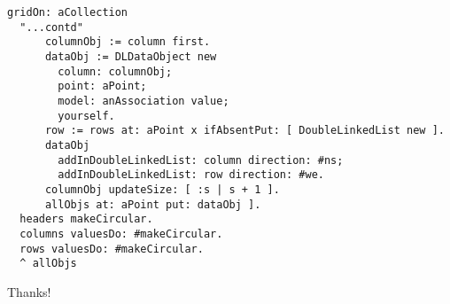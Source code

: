 \documentclass{beamer}
\begin{document}
\begin{frame}[fragile]
\begin{verbatim}
gridOn: aCollection
  "...contd"
      columnObj := column first.
      dataObj := DLDataObject new
        column: columnObj;
        point: aPoint;
        model: anAssociation value;
        yourself.
      row := rows at: aPoint x ifAbsentPut: [ DoubleLinkedList new ].
      dataObj
        addInDoubleLinkedList: column direction: #ns;
        addInDoubleLinkedList: row direction: #we.
      columnObj updateSize: [ :s | s + 1 ].
      allObjs at: aPoint put: dataObj ].
  headers makeCircular.
  columns valuesDo: #makeCircular.
  rows valuesDo: #makeCircular.
  ^ allObjs
\end{verbatim}
\end{frame}


\begin{frame}{ }
\Huge Thanks!
\end{frame}
\end{document}
